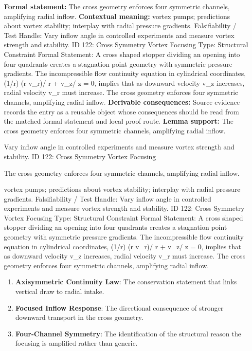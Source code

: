 \begingroup\footnotesize\setlength{\emergencystretch}{3em}\sloppy
\textbf{Formal statement:} The cross geometry enforces four symmetric channels, amplifying radial inflow.
\textbf{Contextual meaning:} vortex pumps; predictions about vortex stability; interplay with radial pressure gradients. Falsifiability / Test Handle: Vary inflow angle in controlled experiments and measure vortex strength and stability. ID 122: Cross Symmetry Vortex Focusing Type: Structural Constraint Formal Statement: A cross shaped stopper dividing an opening into four quadrants creates a stagnation point geometry with symmetric pressure gradients. The incompressible flow continuity equation in cylindrical coordinates, (1/r)  (r v\_r)/ r +   v\_z/  z = 0, implies that as downward velocity v\_z increases, radial velocity v\_r must increase. The cross geometry enforces four symmetric channels, amplifying radial inflow.
\textbf{Derivable consequences:} Source evidence records the entry as a reusable object whose consequences should be read from the matched formal statement and local proof route.
\textbf{Lemma support:} The cross geometry enforces four symmetric channels, amplifying radial inflow.\par
\endgroup

Vary inflow angle in controlled experiments and measure vortex strength and stability. ID 122: Cross Symmetry Vortex Focusing

The cross geometry enforces four symmetric channels, amplifying radial inflow.

vortex pumps; predictions about vortex stability; interplay with radial pressure gradients. Falsifiability / Test Handle: Vary inflow angle in controlled experiments and measure vortex strength and stability. ID 122: Cross Symmetry Vortex Focusing Type: Structural Constraint Formal Statement: A cross shaped stopper dividing an opening into four quadrants creates a stagnation point geometry with symmetric pressure gradients. The incompressible flow continuity equation in cylindrical coordinates, (1/r)  (r v\_r)/ r +   v\_z/  z = 0, implies that as downward velocity v\_z increases, radial velocity v\_r must increase. The cross geometry enforces four symmetric channels, amplifying radial inflow.
\endgroup

\begin{enumerate}[leftmargin=1.6em,itemsep=6pt,topsep=4pt]
\item \textbf{Axisymmetric Continuity Law}: The conservation statement that links vertical draw to radial intake.
\item \textbf{Focused Inflow Response}: The directional consequence of stronger downward transport in the cross geometry.
\item \textbf{Four-Channel Symmetry}: The identification of the structural reason the focusing is amplified rather than generic.
\end{enumerate}

